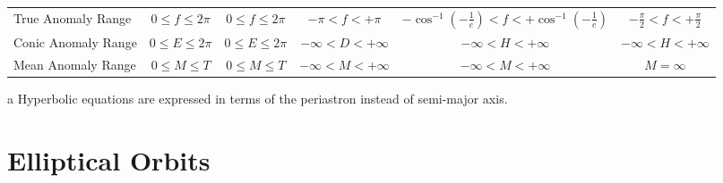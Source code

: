 \documentclass[a4paper,fleqn,usenatbib]{mnras}
\begin{document}
\begin{table}
\begin{threeparttable}
\begin{tabular}{ l c c c c c }
 True Anomaly Range & $0\leq f \leq 2\pi$ & $0\leq f \leq 2\pi$ & $-\pi< f < +\pi$ & $-\cos^{-1}{(-\frac{1}{e})} < f < +\cos^{-1}{(-\frac{1}{e})}$ & $-\frac{\pi}{2} < f < +\frac{\pi}{2}$ \\

 Conic Anomaly Range & $0\leq E \leq 2\pi$ & $0\leq E \leq 2\pi$ & $-\infty < D < +\infty$ & $-\infty< H < +\infty$ & $-\infty< H < +\infty$ \\
 
 Mean Anomaly Range & $0\leq M \leq T$ & $0\leq M \leq T$ & $-\infty< M < +\infty$ & $-\infty < M < +\infty$ & $M=\infty$ \\
 
 \hline
 \hline
\end{tabular}
\label{tab:summary}
	\begin{tablenotes}
	\small
\item[a]{Hyperbolic equations are expressed in terms of the periastron instead of semi-major axis.}
	\end{tablenotes}
\end{threeparttable}
\end{table}


\section{Elliptical Orbits} \label{sec:elliptical}
\end{document}
